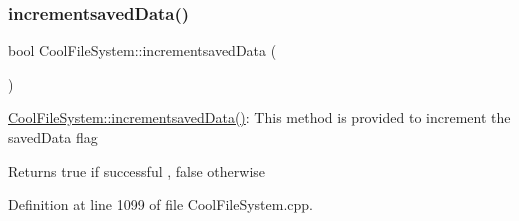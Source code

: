 \subsubsection{\texorpdfstring{incrementsaved\+Data()}{incrementsavedData()}}
{\footnotesize\ttfamily bool Cool\+File\+System\+::incrementsaved\+Data (\begin{DoxyParamCaption}{ }\end{DoxyParamCaption})}

\hyperlink{class_cool_file_system_aae045125288f255f3e258073dcada2a6}{Cool\+File\+System\+::incrementsaved\+Data()}\+: This method is provided to increment the saved\+Data flag

\begin{DoxyReturn}{Returns}
true if successful , false otherwise 
\end{DoxyReturn}


Definition at line 1099 of file Cool\+File\+System.\+cpp.


